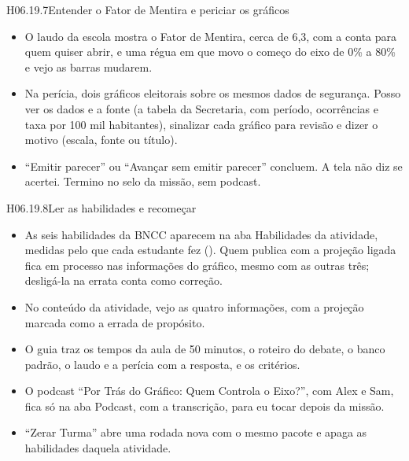 \begin{historia}{H06.19.7}{Entender o Fator de Mentira e periciar os gráficos}{\pronto}
\aceite
\begin{itemize}
  \item O laudo da escola mostra o Fator de Mentira, cerca de 6,3, com a
    conta para quem quiser abrir, e uma régua em que movo o começo do eixo de
    0\% a 80\% e vejo as barras mudarem.
  \item Na perícia, dois gráficos eleitorais sobre os mesmos dados de
    segurança. Posso ver os dados e a fonte (a tabela da Secretaria, com
    período, ocorrências e taxa por 100 mil habitantes), sinalizar cada gráfico para
    revisão e dizer o motivo (escala, fonte ou título).
  \item \enquote{Emitir parecer} ou \enquote{Avançar sem emitir parecer}
    concluem. A tela não diz se acertei. Termino no selo da missão, sem
    podcast.
\end{itemize}
\end{historia}

\begin{historia}{H06.19.8}{Ler as habilidades e recomeçar}{\pronto}
\aceite
\begin{itemize}
  \item As seis habilidades da BNCC aparecem na aba Habilidades da atividade,
    medidas pelo que cada estudante fez (). Quem publica com a
    projeção ligada fica em processo nas informações do gráfico, mesmo com as
    outras três; desligá-la na errata conta como correção.
  \item No conteúdo da atividade, vejo as quatro informações, com a projeção
    marcada como a errada de propósito.
  \item O guia traz os tempos da aula de 50 minutos, o roteiro do debate, o
    banco padrão, o laudo e a perícia com a resposta, e os critérios.
  \item O podcast \enquote{Por Trás do Gráfico: Quem Controla o Eixo?}, com
    Alex e Sam, fica só na aba Podcast, com a transcrição, para eu tocar
    depois da missão.
  \item \enquote{Zerar Turma} abre uma rodada nova com o mesmo pacote e apaga
    as habilidades daquela atividade.
\end{itemize}
\end{historia}

